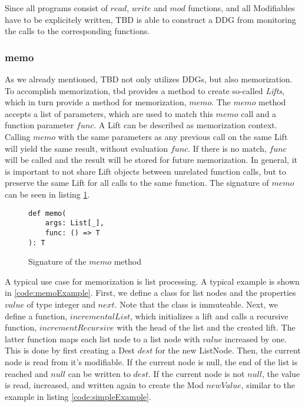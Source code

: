 Since all programs consist of $read$, $write$ and $mod$ functions, and all Modifiables have to be explicitely written, TBD is able to construct a DDG from monitoring the calls to the corresponding functions.

\subsubsection{memo}
As we already mentioned, TBD not only utilizes DDGs, but also memorization. To accomplish memorization, tbd provides a method to create so-called \textit{Lifts}, which in turn provide a method for memorization, $memo$. The $memo$ method accepts a list of parameters, which are used to match this $memo$ call and a function parameter $func$. A Lift can be described as memorization context. Calling $memo$ with the same parameters as any previous call on the same Lift will yield the same result, without evaluation $func$. If there is no match, $func$ will be called and the result will be stored for future memorization. In general, it is important to not share Lift objects between unrelated function calls, but to preserve the same Lift for all calls to the same function. The signature of $memo$ can be seen in listing \ref{code:memo}.

\begin{figure}
\begin{lstlisting}[frame=single,basicstyle=\ttfamily]
def memo(
    args: List[_], 
    func: () => T
): T
\end{lstlisting}
\caption{Signature of the $memo$ method}
\label{code:memo}
\end{figure}

A typical use case for memorization is list processing. A typical example is shown in \ref{code:memoExample}. First, we define a class for list nodes and the properties $value$ of type integer and $next$. Note that the class is immuteable. Next, we define a function, $incrementalList$, which initializes a lift and calls a recursive function, $incrementRecursive$ with the head of the list and the created lift. The latter function maps each list node to a list node with $value$ increased by one. This is done by first creating a Dest $dest$ for the new ListNode. Then, the current node is read from it's modifiable. If the current node is null, the end of the list is reached and $null$ can be written to $dest$. If the current node is not $null$, the value is read, increased, and written again to create the Mod $newValue$, similar to the example in listing \ref{code:simpleExample}. 

